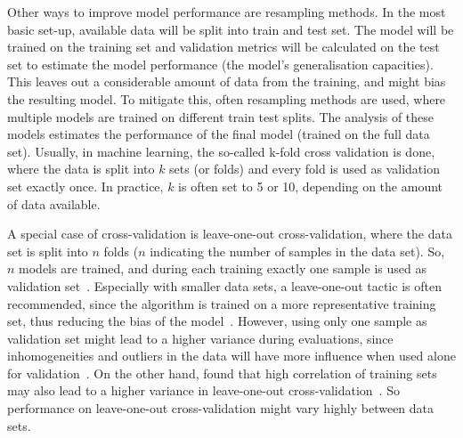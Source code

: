 Other ways to improve model performance are resampling methods.
In the most basic set-up, available data will be split into train and test set.
The model will be trained on the training set and validation metrics will be calculated on the test set to estimate the model performance (the model's generalisation capacities).
This leaves out a considerable amount of data from the training, and might bias the resulting model.
To mitigate this, often resampling methods are used, where multiple models are trained on different train test splits.
The analysis of these models estimates the performance of the final model (trained on the full data set).
Usually, in machine learning, the so-called k-fold cross validation is done, where the data is split into $k$ sets (or folds) and every fold is used as validation set exactly once.
In practice, $k$ is often set to 5 or 10, depending on the amount of data available.~\autocite[Chapter 5]{James2013}

A special case of cross-validation is leave-one-out cross-validation, where the data set is split into $n$ folds ($n$ indicating the number of samples in the data set).
So, $n$ models are trained, and during each training exactly one sample is used as validation set~\autocite[Chapter 5]{James2013}.
Especially with smaller data sets, a leave-one-out tactic is often recommended, since the algorithm is trained on a more representative training set, thus reducing the bias of the model~\autocite[Chapter 5]{James2013}. %
However, using only one sample as validation set might lead to a higher variance during evaluations, since inhomogeneities and outliers in the data will have more influence when used alone for validation~\autocite[Chapter 5]{James2013}.
On the other hand, \citeauthor{Bengio2004} found that high correlation of training sets may also lead to a higher variance in leave-one-out cross-validation~\autocite{Bengio2004}. %
So performance on leave-one-out cross-validation might vary highly between data sets.

